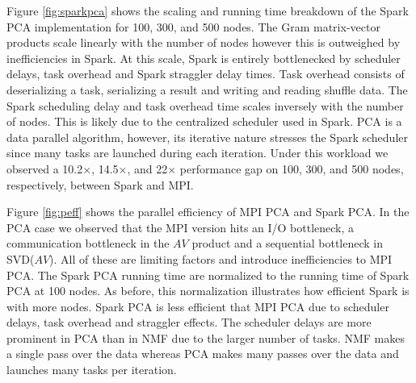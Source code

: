 Figure \ref{fig:sparkpca} shows the scaling and running time breakdown of the Spark PCA implementation for 100, 300, and 500 nodes. The Gram matrix-vector products scale linearly with the number of nodes however this is outweighed by inefficiencies in Spark. At this scale, Spark is entirely bottlenecked by scheduler delays, task overhead and Spark straggler delay times. Task overhead consists of deserializing a task, serializing a result and writing and reading shuffle data. The Spark scheduling delay and task overhead time scales inversely with the number of nodes. This is likely due to the centralized scheduler used in Spark. PCA is a data parallel algorithm, however, its iterative nature stresses the Spark scheduler since many tasks are launched during each iteration. Under this workload we observed a 10.2$\times$, 14.5$\times$, and 22$\times$ performance gap on 100, 300, and 500 nodes, respectively, between Spark and MPI.

Figure \ref{fig:peff} shows the parallel efficiency of MPI PCA and Spark PCA. In the PCA case we observed that the MPI version hits an I/O bottleneck, a communication bottleneck in the $AV$ product and a sequential bottleneck in SVD($AV$). All of these are limiting factors and introduce inefficiencies to MPI PCA. The Spark PCA running time are normalized to the running time of Spark PCA at 100 nodes. As before, this normalization illustrates how efficient Spark is with more nodes. Spark PCA is less efficient that MPI PCA due to scheduler delays, task overhead and straggler effects. The scheduler delays are more prominent in PCA than in NMF due to the larger number of tasks. NMF makes a single pass over the data whereas PCA makes many passes over the data and launches many tasks per iteration.



